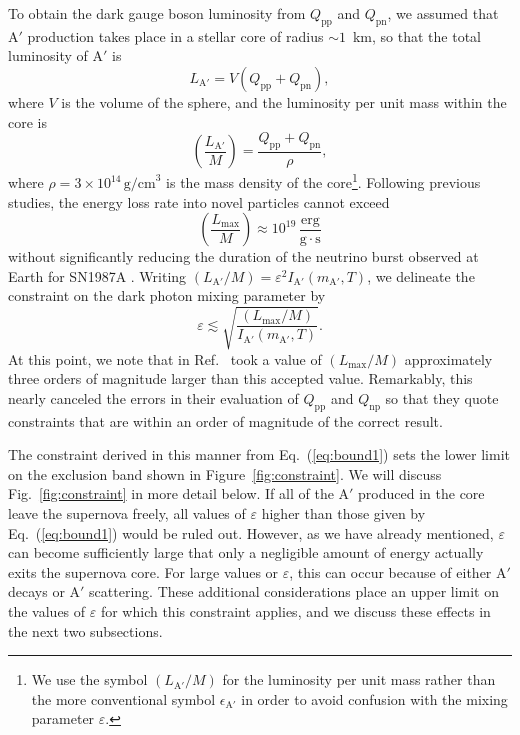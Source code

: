 \documentclass[nofootinbib,prd,superscriptaddress,twocolumn]{revtex4}
\newcommand{\Aprime}{\mathrm{A}'}
\begin{document}
To obtain the dark gauge boson luminosity from $Q_{\mathrm{pp}}$ and $Q_{\mathrm{pn}}$, 
we assumed that $\Aprime$ production takes place in a stellar core of radius $\sim 1$~km, 
so that the total luminosity of $\Aprime$ is 
%
\begin{equation}
L_{\mathrm{A}'} = V (Q_{\mathrm{pp}} + Q_{\mathrm{pn}}),
\end{equation}
%
where $V$ is the volume of the sphere, and the luminosity per unit mass within the core is 
%
\begin{equation}
\left( \frac{L_{\mathrm{A'}}}{M} \right) = \frac{Q_{\mathrm{pp}} + Q_{\mathrm{pn}}}{\rho}, 
\end{equation}
%
where $\rho = 3 \times 10^{14}\, \mathrm{g/cm}^3$ is the mass density of the core\footnote{
We use the symbol $\left( L_{\mathrm{A'}}/M \right)$ for the luminosity per unit mass rather than 
the more conventional symbol $\epsilon_{\mathrm{A'}}$ in order to avoid confusion with the 
mixing parameter $\varepsilon$.}. Following previous studies, the energy loss rate into novel 
particles cannot exceed 
%
\begin{equation}
\left( \frac{L_{\mathrm{max}}}{M} \right) \approx 10^{19} \, \frac{\mathrm{erg}}{\mathrm{g}\cdot \mathrm{s}}
\end{equation}
%
without significantly reducing the duration of the neutrino burst observed at Earth for SN1987A 
\cite{raffelt96_book}. Writing $(L_{\mathrm{A'}}/M) = \varepsilon^2 I_{\mathrm{A'}}(m_{\mathrm{A'}},T)$, 
we delineate the constraint on the dark photon mixing parameter by 
%
\begin{equation}
\label{eq:bound1}
\varepsilon \lesssim \sqrt{\frac{(L_{\mathrm{max}}/M)}{I_{\mathrm{A}'}(m_{\mathrm{A}'}, T)}}.
\end{equation}
%
At this point, we note that in Ref.~\cite{dent_etal12} took a value of 
$(L_{\mathrm{max}}/M)$ approximately three orders of magnitude larger than 
this accepted value. Remarkably, this nearly canceled the errors in their evaluation of 
$Q_{\mathrm{pp}}$ and $Q_{\mathrm{np}}$ so that they quote constraints that are 
within an order of magnitude of the correct result.


The constraint derived in this manner from Eq.~(\ref{eq:bound1}) sets the lower limit on the 
exclusion band shown in Figure~\ref{fig:constraint}. We will discuss Fig.~\ref{fig:constraint} 
in more detail below. If all of the $\Aprime$ produced in the core leave the supernova freely, all 
values of $\varepsilon$ higher than those given by Eq.~(\ref{eq:bound1}) would be ruled out. 
However, as we have already mentioned, $\varepsilon$ can become sufficiently large that only a 
negligible amount of energy actually exits the supernova core. For large values or $\varepsilon$, 
this can occur because of either $\Aprime$ decays or $\Aprime$ scattering. These additional considerations place 
an upper limit on the values of $\varepsilon$ for which this constraint applies, 
and we discuss these effects in the next two subsections.
\end{document}
